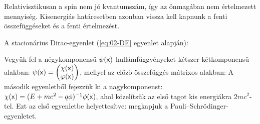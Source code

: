    Relativisztikusan a spin nem jó kvantumszám, így az önmagában nem értelmezett mennyiség. Kisenergiás határesetben azonban vissza kell kapnunk a fenti összefüggéseket és a fenti értelmezést. 
   
   A stacionárius Dirac-egyenlet (\eqref{eq:02-DE} egyenlet alapján):
   
   Vegyük fel a négykomponensű $\psi(\mathsf{x})$ hullámfüggvényeket kétszer kétkomponensű alakban: 
   $\psi(\mathsf{x})=\begin{pmatrix}
                    \chi(\mathsf{x})\\
                    \varphi(\mathsf{x})
                   \end{pmatrix}$,
   mellyel az előző összefüggés mátrixos alakban:
   A második egyenletből fejezzük ki a nagykomponenst: $\chi(\mathsf{x})=(E+mc^2-q\phi)^{-1}\phi(\mathsf{x})$, ahol közelítsük az első tagot kis energiákra $2mc^2$-tel. Ezt az első egyenletbe helyettesítve:
   megkapjuk a Pauli--Schrödinger-egyenletet. 